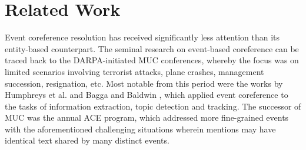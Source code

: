 \documentclass[11pt,a4paper]{article}
\begin{document}

\section{Related Work}
Event coreference resolution has received significantly less attention than its entity-based counterpart.  The seminal research on event-based coreference can be traced back to the DARPA-initiated MUC conferences, whereby the focus was on limited scenarios involving terrorist attacks, plane crashes, management succession, resignation, etc.  Most notable from this period were the works by Humphreys et al.  and Bagga and Baldwin , which applied event coreference to the tasks of information extraction, topic detection and tracking.  The successor of MUC was the annual ACE program, which addressed more fine-grained events with the aforementioned challenging situations wherein mentions may have identical text shared by many distinct events.



\end{document}
